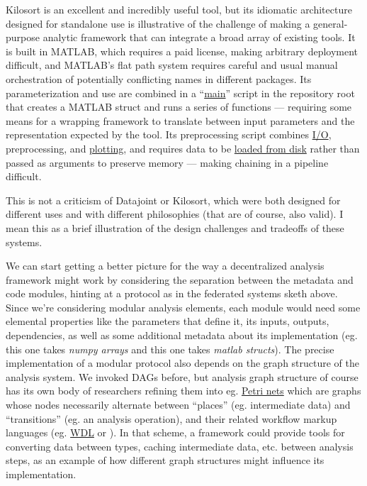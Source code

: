 \documentclass[10pt]{tufte-book}
\begin{document}
Kilosort is an excellent and incredibly useful tool, but its idiomatic
architecture designed for standalone use is illustrative of the
challenge of making a general-purpose analytic framework that can
integrate a broad array of existing tools. It is built in MATLAB, which
requires a paid license, making arbitrary deployment difficult, and
MATLAB's flat path system requires careful and usual manual
orchestration of potentially conflicting names in different packages.
Its parameterization and use are combined in a
``\href{https://github.com/MouseLand/Kilosort/blob/db3a3353d9a374ea2f71674bbe443be21986c82c/main_kilosort3.m}{main}''
script in the repository root that creates a MATLAB struct and runs a
series of functions --- requiring some means for a wrapping framework to
translate between input parameters and the representation expected by
the tool. Its preprocessing script combines
\href{https://github.com/MouseLand/Kilosort/blob/a1fccd9abf13ce5dc3340fae8050f9b1d0f8ab7a/preProcess/datashift.m\#L74-L77}{I/O},
preprocessing, and
\href{https://github.com/MouseLand/Kilosort/blob/a1fccd9abf13ce5dc3340fae8050f9b1d0f8ab7a/preProcess/datashift.m\#L57-L68}{plotting},
and requires data to be
\href{https://github.com/MouseLand/Kilosort/blob/a1fccd9abf13ce5dc3340fae8050f9b1d0f8ab7a/preProcess/preprocessDataSub.m\#L82-L84}{loaded
from disk} rather than passed as arguments to preserve memory --- making
chaining in a pipeline difficult.

This is not a criticism of Datajoint or Kilosort, which were both
designed for different uses and with different philosophies (that are of
course, also valid). I mean this as a brief illustration of the design
challenges and tradeoffs of these systems.

We can start getting a better picture for the way a decentralized
analysis framework might work by considering the separation between the
metadata and code modules, hinting at a protocol as in the federated
systems sketh above. Since we're considering modular analysis elements,
each module would need some elemental properties like the parameters
that define it, its inputs, outputs, dependencies, as well as some
additional metadata about its implementation (eg. this one takes
\emph{numpy arrays} and this one takes \emph{matlab structs}). The
precise implementation of a modular protocol also depends on the graph
structure of the analysis system. We invoked DAGs before, but analysis
graph structure of course has its own body of researchers refining them
into eg. \href{https://en.wikipedia.org/wiki/Petri_net}{Petri nets}
which are graphs whose nodes necessarily alternate between ``places''
(eg. intermediate data) and ``transitions'' (eg. an analysis operation),
and their related workflow markup languages (eg.
\href{https://openwdl.org/}{WDL} or \citep{vanderaalstYAWLAnotherWorkflow2005} ). In that scheme, a framework
could provide tools for converting data between types, caching
intermediate data, etc. between analysis steps, as an example of how
different graph structures might influence its implementation.
\end{document}

